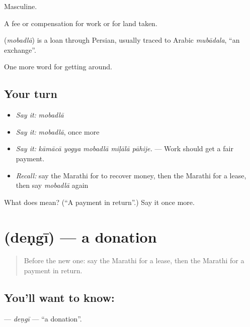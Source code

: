 Masculine.

A fee or compensation for work or for land taken.

\begin{cousinweb}
\textbf{} (\emph{mobadlā}) is a loan through Persian, usually traced to Arabic \emph{mubādala}, \textquotedblleft{}an exchange\textquotedblright{}.
\end{cousinweb}

\begin{grammarlens}[title={What you've built}]
One more word for getting around.
\end{grammarlens}

\subsection*{Your turn}
\begin{itemize}
\raggedright
  \item \emph{Say it:} \emph{mobadlā}
  \item \emph{Say it:} \emph{mobadlā}, once more
  \item \emph{Say it:} \emph{kāmācā yogya mobadlā miḷālā pāhije.} — Work should get a fair payment.
  \item \emph{Recall:} say the Marathi for to recover money, then the Marathi for a lease, then say \emph{mobadlā} again
\end{itemize}

\begin{tcolorbox}[breakable,colback=teal!4,colframe=teal!35!black,title={Before you move on}]
What does  mean? (\textquotedblleft{}A payment in return\textquotedblright{}.) Say it once more.
\end{tcolorbox}
\section[\texorpdfstring{\mr{देणगी} (deṇgī)}{देणगी (deṇgī)}]{ (deṇgī) — a donation}

\label{lesson:MR-C430-dengi}



\begin{quote}
Before the new one: say the Marathi for a lease, then the Marathi for a payment in return.
\end{quote}

\subsection*{You'll want to know: }
\textbf{} — \emph{deṇgī} — \textquotedblleft{}a donation\textquotedblright{}.

